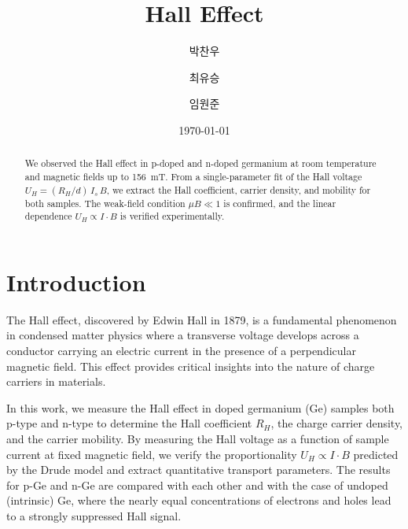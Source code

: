 \documentclass[%
 reprint,
 amsmath,amssymb,
 aps,
]{revtex4-2}
\begin{document}

\title{Hall Effect}

\author{박찬우}
\author{최유승}
\author{임원준}

\date{\today}

\begin{abstract}
We observed the Hall effect in p-doped and n-doped germanium at room temperature and magnetic fields up to 156~mT. From a single-parameter fit of the Hall voltage $U_H = (R_H/d)\,I_s\,B$, we extract the Hall coefficient, carrier density, and mobility for both samples. The weak-field condition $\mu B \ll 1$ is confirmed, and the linear dependence $U_H \propto I \cdot B$ is verified experimentally.
\end{abstract}

\maketitle


\section{\label{sec:intro}Introduction}


The Hall effect, discovered by Edwin Hall in 1879, is a fundamental phenomenon in condensed matter physics where a transverse voltage develops across a conductor carrying an electric current in the presence of a perpendicular magnetic field. This effect provides critical insights into the nature of charge carriers in materials. 

In this work, we measure the Hall effect in doped germanium (Ge) samples both p-type and n-type to determine the Hall coefficient $R_H$, the charge carrier density, and the carrier mobility. By measuring the Hall voltage as a function of sample current at fixed magnetic field, we verify the proportionality $U_H \propto I \cdot B$ predicted by the Drude model and extract quantitative transport parameters. The results for p-Ge and n-Ge are compared with each other and with the case of undoped (intrinsic) Ge, where the nearly equal concentrations of electrons and holes lead to a strongly suppressed Hall signal.
\end{document}
